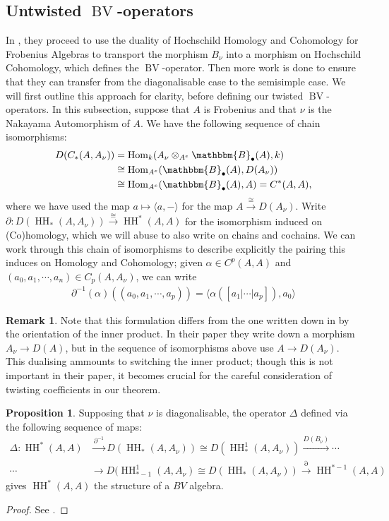 \documentclass{article}
\newcommand{\HH}{\operatorname{HH}}
\newcommand{\homo}{\operatorname{Hom}}
\newcommand{\bv}{\operatorname{BV}}
\theoremstyle{plain}
\theoremstyle{definition}
\newtheorem{remark}[theorem]{Remark}
\newtheorem{proposition}[theorem]{Proposition}
\begin{document}
\subsection{Untwisted $\bv$-operators}
In \cite{Lambre}, they proceed to use the duality of Hochschild Homology and Cohomology for Frobenius Algebras to transport the morphism $B_\nu$ into a morphism on Hochschild Cohomology, which defines the $\bv$-operator. Then more work is done to ensure that they can transfer from the diagonalisable case to the semisimple case. We will first outline this approach for clarity, before defining our twisted $\bv$-operators. In this subsection, suppose that $A$ is Frobenius and that $\nu$ is the Nakayama Automorphism of $A$. We have the following sequence of chain isomorphisms:
$$\begin{aligned}D(C_*(A,A_\nu))&=\homo_k(A_\nu \otimes_{A^e} \mathbbm{B}_\bullet (A), k) \\
& \cong \homo_{A^e}(\mathbbm{B}_\bullet (A), D(A_\nu)) \\
& \cong \homo_{A^e}(\mathbbm{B}_\bullet (A), A) = C^*(A,A),
\end{aligned}$$
where we have used the map $a \mapsto \langle a, - \rangle$ for the map $A \xrightarrow{\cong} D(A_\nu)$. Write $\partial:D(\HH_*(A,A_\nu)) \xrightarrow{\cong} \HH^*(A,A)$ for the isomorphism induced on (Co)homology, which we will abuse to also write on chains and cochains. We can work through this chain of isomorphisms to describe explicitly the pairing this induces on Homology and Cohomology; given $\alpha \in C^p(A,A)$ and $(a_0, a_1, \cdots, a_n) \in C_p(A,A_\nu)$, we can write 
$$\begin{aligned}
\partial^{-1}(\alpha)((a_0, a_1, \cdots, a_p))= \langle  \alpha([ a_1 | \cdots | a_p ]) , a_0\rangle
\end{aligned}$$
\begin{remark} Note that this formulation differs from the one written down in \cite{Lambre} by the orientation of the inner product. In their paper they write down a morphism $A_\nu \rightarrow D(A)$, but in the sequence of isomorphisms above use $A \rightarrow D(A_\nu)$. This dualising ammounts to switching the inner product; though this is not important in their paper, it becomes crucial for the careful consideration of twisting coefficients in our theorem.\end{remark}
\begin{proposition} Supposing that $\nu$ is diagonalisable, the operator $\Delta$ defined via the following sequence of maps:
$$\begin{aligned}\Delta: \HH^*(A,A) &\xrightarrow{\partial^{-1}} D(\HH_*(A,A_\nu)) \cong D(\HH_*^1(A, A_\nu)) \xrightarrow{D(B_\nu)} \cdots \\
\cdots &\rightarrow D(\HH_{*-1}^1(A, A_\nu) \cong D(\HH_*(A,A_\nu)) \xrightarrow{\partial} \HH^{*-1}(A,A)
\end{aligned}
$$
gives $\HH^*(A,A)$ the structure of a $BV$ algebra. 
\begin{proof} See \cite{Lambre}. \end{proof}
\end{proposition}
\end{document}
